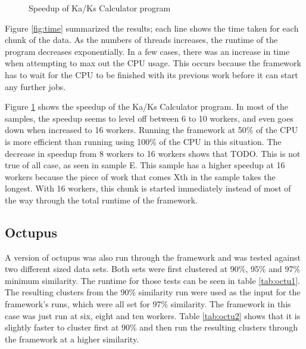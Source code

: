 \documentclass[12pt]{article}
\begin{document}
\begin{figure}
    \begin{center}
    \end{center}
    \caption{Speedup of Ka/Ks Calculator program}
    \label{fig:speedup}
\end{figure}

Figure \ref{fig:time} summarized the results; each line shows the time taken for
each chunk of the data. As the numbers of threads increases, the runtime of the
program decreases exponentially. In a few cases, there was an increase in time
when attempting to max out the CPU usage. This occurs because the framework has
to wait for the CPU to be finished with its previous work before it can start
any further jobs. 

Figure \ref{fig:speedup} shows the speedup of the Ka/Ks Calculator program. 
In most of the samples, the speedup seems to level off between 6 to 10 workers,
and even goes down when increased to 16 workers. Running the framework at 50\% 
of the CPU is more efficient than running using 100\% of the CPU in this 
situation. The decrease in speedup from 8 workers to 16 workers shows that TODO.
This is not true of all case, as seen in sample E. This sample has a higher
speedup at 16 workers because the piece of work that comes Xth in the sample
takes the longest. With 16 workers, this chunk is started immediately instead of
most of the way through the total runtime of the framework.
\subsection{Octupus}

A version of octupus was also run through the framework and was tested against
two different sized data sets. Both sets were first clustered at 90\%, 95\% and
97\% minimum similarity. The runtime for those tests can be seen in table
\ref{tab:octu1}. The resulting clusters from the 90\% similarity run were used as
the input for the framework's runs, which were all set for 97\% similarity. 
The framework in this case was just run at six, eight and ten workers. Table 
\ref{tab:octu2} shows that it is slightly faster to cluster first at 90\% and 
then run the resulting clusters through the framework at a higher similarity. 
\end{document}
